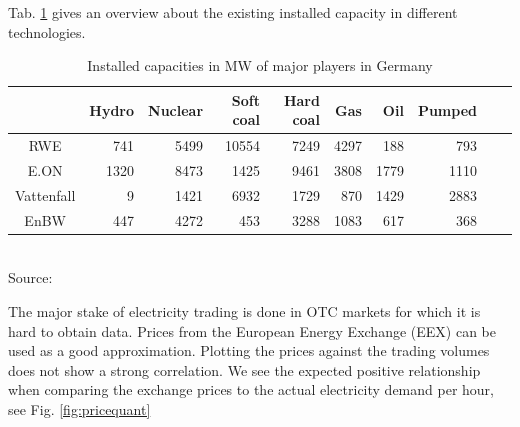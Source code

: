 Tab. \ref{tab:majorcapacities} gives an overview about the existing installed capacity in different technologies.

\begin{table}[htb]
\centering
\scriptsize
\caption{Installed capacities in MW of major players in Germany}
\vspace{0.3cm}
\begin{tabular}[htb]{crrrrrrrrr}
\hline
           &      Hydro &    Nuclear &  Soft coal &  Hard coal &        Gas &        Oil &     Pumped \\
\hline\hline
       RWE &        741 &       5499 &      10554 &       7249 &       4297 &        188 &        793 \\

      E.ON &       1320 &       8473 &       1425 &       9461 &       3808 &       1779 &       1110 \\

Vattenfall &          9 &       1421 &       6932 &       1729 &        870 &       1429 &       2883 \\

      EnBW &        447 &       4272 &        453 &       3288 &       1083 &        617 &        368 \\
\hline
\end{tabular} 
\label{tab:majorcapacities}
\\
\vspace{0.3cm}
\scriptsize Source: \cite{Ellersdorfer2005}
\end{table}



The major stake of electricity trading is done in OTC markets for which it is hard to obtain data. Prices from the European Energy Exchange (EEX) can be used as a good approximation. Plotting the prices against the trading volumes does not show a strong correlation. We see the expected positive relationship when comparing the exchange prices to the actual electricity demand per hour, see Fig. \ref{fig:pricequant}

